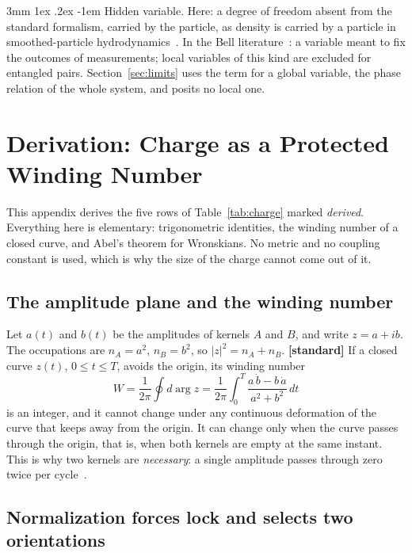 \documentclass[%
 reprint, amsmath,amssymb, aps, prb, ]{revtex4-2}
\makeatletter
\numberwithin{equation}{section}
\renewcommand\paragraph{%
  \@startsection{paragraph}{4}{\z@}%
    {3mm \@plus 1ex \@minus .2ex}%
    {-1em}%
    {\normalfont\normalsize\itshape}}
\makeatother
\begin{document}
\paragraph{Hidden variable.} Here: a degree of freedom absent from the standard formalism, carried by the particle, as density is carried by a particle in smoothed-particle hydrodynamics~\cite{ref:monaghan}. In the Bell literature~\cite{ref:bell66}: a variable meant to fix the outcomes of measurements; local variables of this kind are excluded for entangled pairs. Section~\ref{sec:limits} uses the term for a global variable, the phase relation of the whole system, and posits no local one.

\section{Derivation: Charge as a Protected Winding Number}
\label{app:charge}

This appendix derives the five rows of Table~\ref{tab:charge} marked \emph{derived}. Everything here is elementary: trigonometric identities, the winding number of a closed curve, and Abel's theorem for Wronskians. No metric and no coupling constant is used, which is why the size of the charge cannot come out of it.

\subsection{The amplitude plane and the winding number}

Let $a(t)$ and $b(t)$ be the amplitudes of kernels $A$ and $B$, and write $z=a+ib$. The occupations are $n_A=a^2$, $n_B=b^2$, so $|z|^2=n_A+n_B$. \textbf{[standard]} If a closed curve $z(t)$, $0\le t\le T$, avoids the origin, its winding number~\cite{ref:hatcher}
\begin{equation}
W=\frac{1}{2\pi}\oint d\arg z=\frac{1}{2\pi}\int_0^T\frac{a\,\dot b-b\,\dot a}{a^2+b^2}\,dt
\label{eq:Wdef}
\end{equation}
is an integer, and it cannot change under any continuous deformation of the curve that keeps away from the origin. It can change only when the curve passes through the origin, that is, when both kernels are empty at the same instant. This is why two kernels are \emph{necessary}: a single amplitude passes through zero twice per cycle~\cite{ref:p1,ref:p20}.

\subsection{Normalization forces lock and selects two orientations}
\end{document}
